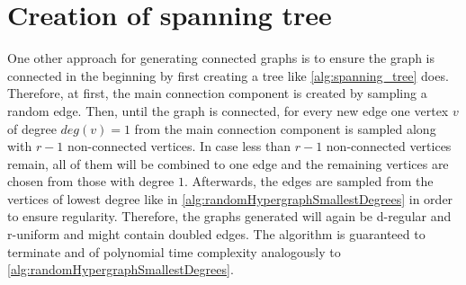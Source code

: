 \section{Creation of spanning tree}
One other approach for generating connected graphs is to ensure the graph is connected in the beginning by first creating a tree like  \cref{alg:spanning_tree} does. Therefore, at first, the main connection component is created by sampling a random edge. Then, until the graph is connected, for every new edge one vertex $v$ of degree $deg(v) = 1$ from the main connection component is sampled along with $r-1$ non-connected vertices. In case less than $r-1$ non-connected vertices remain, all of them will be combined to one edge and the remaining vertices are chosen from those with degree $1$.
Afterwards, the edges are sampled from the vertices of lowest degree like in \cref{alg:randomHypergraphSmallestDegrees} in order to ensure regularity.
Therefore, the graphs generated will again be d-regular and r-uniform and might contain doubled edges. The algorithm is guaranteed to terminate and of polynomial time complexity analogously to \cref{alg:randomHypergraphSmallestDegrees}.


